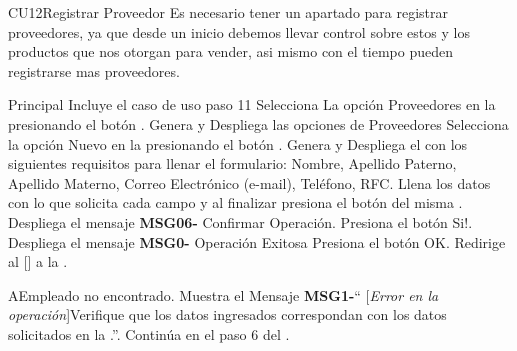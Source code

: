 \begin{UseCase}{CU12}{Registrar Proveedor}{
		Es necesario tener un apartado para registrar proveedores, ya que desde un inicio debemos llevar control sobre estos y los productos que nos otorgan para vender, asi mismo con el tiempo pueden registrarse mas proveedores.
	}
	\end{UseCase}
	\begin{UCtrayectoria}{Principal}
		\UCpaso Incluye el caso de uso  paso 11
		\UCpaso[\UCactor] Selecciona La opción Proveedores en la  presionando el botón .
		\UCpaso Genera y Despliega las opciones de Proveedores 
		\UCpaso [\UCactor] Selecciona la opción Nuevo en la  presionando el botón .
		\UCpaso Genera y Despliega el  con los siguientes requisitos para llenar el formulario: Nombre, Apellido Paterno, Apellido Materno, Correo Electrónico (e-mail), Teléfono, RFC.
		\UCpaso[\UCactor] Llena los datos con lo que solicita cada campo y al finalizar presiona el botón  del misma . 
		\UCpaso Despliega el mensaje {\bf MSG06-} {Confirmar Operación}. 
		\UCpaso [\UCactor] Presiona el botón {Si!}.
		\UCpaso Despliega el mensaje {\bf MSG0-} {Operación Exitosa}
		\UCpaso [\UCactor] Presiona el botón {OK}.
		\UCpaso Redirige al [\UCactor] a la  .
	\end{UCtrayectoria}


\begin{UCtrayectoriaA}{A}{Empleado no encontrado.}
			\UCpaso Muestra el Mensaje {\bf MSG1-}`` [{\em Error en la operación}]Verifique que los datos ingresados correspondan con los datos solicitados en la  .''.
			\UCpaso Continúa en el paso 6 del .
		\end{UCtrayectoriaA}
